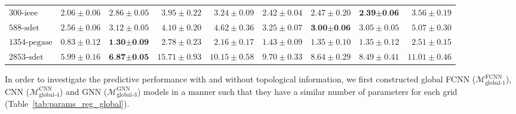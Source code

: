 \documentclass[journal]{IEEEtran}
\begin{document}
\begin{table*}[!ht]
{\begin{tabular}{lr|rrrrrrr}
    $\textrm{300-ieee}$ & $2.06 \pm 0.06$ & $2.86 \pm 0.05$ & $3.95 \pm 0.22$ & $3.24 \pm 0.09$ & $2.42 \pm 0.04$ & $2.47 \pm 0.20$ & $\textbf{2.39} \boldsymbol{\pm} \textbf{0.06}$ & $3.56 \pm 0.19$ \\
    $\textrm{588-sdet}$ & $2.56 \pm 0.06$ & $3.12 \pm 0.05$ & $4.10 \pm 0.20$ & $4.62 \pm 0.36$ & $3.25 \pm 0.07$ & $\textbf{3.00} \boldsymbol{\pm} \textbf{0.06}$ & $3.05 \pm 0.05$ & $5.07 \pm 0.30$ \\
    $\textrm{1354-pegase}$ & $0.83 \pm 0.12$ & $\textbf{1.30} \boldsymbol{\pm} \textbf{0.09}$ & $2.78 \pm 0.23$ & $2.16 \pm 0.17$ & $1.43 \pm 0.09$ & $1.35 \pm 0.10$ & $1.35 \pm 0.12$ & $2.51 \pm 0.15$ \\
    $\textrm{2853-sdet}$ & $5.99 \pm 0.16$ & $\textbf{6.87} \boldsymbol{\pm} \textbf{0.05}$ & $15.71 \pm 0.93$ & $10.15 \pm 0.58$ & $9.70 \pm 0.33$ & $8.64 \pm 0.29$ & $8.49 \pm 0.41$ & $11.01 \pm 0.46$ \\
    \bottomrule
    \end{tabular}
   }
\end{table*}

In order to investigate the predictive performance with and without topological information, we first constructed global FCNN ($\mathcal{M}^{\textrm{FCNN}}_{\textrm{global-1}}$), CNN ($\mathcal{M}^{\textrm{CNN}}_{\textrm{global-4}}$) and GNN ($\mathcal{M}^{\textrm{GNN}}_{\textrm{global-3}}$) models in a manner such that they have a similar number of parameters for each grid (Table~\ref{tab:params_reg_global}).
\end{document}
